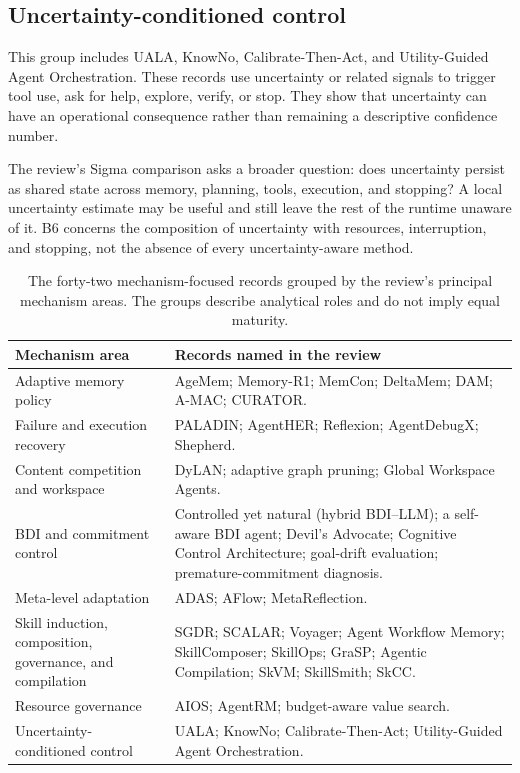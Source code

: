 \subsection{Uncertainty-conditioned control}

This group includes UALA, KnowNo, Calibrate-Then-Act, and Utility-Guided Agent Orchestration. These records use uncertainty or related signals to trigger tool use, ask for help, explore, verify, or stop. They show that uncertainty can have an operational consequence rather than remaining a descriptive confidence number.

The review's Sigma comparison asks a broader question: does uncertainty persist as shared state across memory, planning, tools, execution, and stopping? A local uncertainty estimate may be useful and still leave the rest of the runtime unaware of it. B6 concerns the composition of uncertainty with resources, interruption, and stopping, not the absence of every uncertainty-aware method.

\begin{table}[tbp]
\centering
\small
\caption{The forty-two mechanism-focused records grouped by the review's principal mechanism areas. The groups describe analytical roles and do not imply equal maturity.}
\label{tab:ch11-modern-records}
\begin{tabularx}{\textwidth}{@{}p{}X@{}}
\toprule
\textbf{Mechanism area} & \textbf{Records named in the review}\\
\midrule
Adaptive memory policy & AgeMem; Memory-R1; MemCon; DeltaMem; DAM; A-MAC; CURATOR.\\
Failure and execution recovery & PALADIN; AgentHER; Reflexion; AgentDebugX; Shepherd.\\
Content competition and workspace & DyLAN; adaptive graph pruning; Global Workspace Agents.\\
BDI and commitment control & Controlled yet natural (hybrid BDI--LLM); a self-aware BDI agent; Devil's Advocate; Cognitive Control Architecture; goal-drift evaluation; premature-commitment diagnosis.\\
Meta-level adaptation & ADAS; AFlow; MetaReflection.\\
Skill induction, composition, governance, and compilation & SGDR; SCALAR; Voyager; Agent Workflow Memory; SkillComposer; SkillOps; GraSP; Agentic Compilation; SkVM; SkillSmith; SkCC.\\
Resource governance & AIOS; AgentRM; budget-aware value search.\\
Uncertainty-conditioned control & UALA; KnowNo; Calibrate-Then-Act; Utility-Guided Agent Orchestration.\\
\bottomrule
\end{tabularx}
\end{table}

